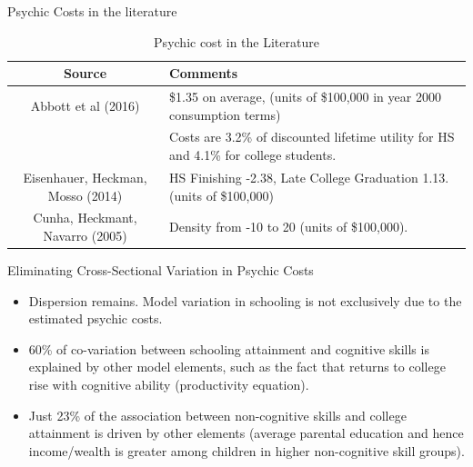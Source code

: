 \documentclass{beamer}
\begin{document}
\begin{frame}{Psychic Costs in the literature}

\begin{table}[H]
\caption {Psychic cost in the Literature} \label{tab:title} 
\begin{center}
  \begin{tabular}{c |  l     }
      \hline
Source & Comments \\\hline

\tiny{Abbott et al (2016)} &\tiny{\$1.35 on average, (units of \$100,000 in year 2000 consumption terms)}  \\

&\tiny{Costs are 3.2\% of discounted lifetime utility for HS and 4.1\% for college students.}  \\\hline

\tiny{Eisenhauer, Heckman, Mosso (2014)} &\tiny{ HS Finishing -2.38, Late College Graduation 1.13. (units of \$100,000)}  \\\hline
\tiny{Cunha, Heckmant, Navarro (2005)} &\tiny{Density from -10 to 20 (units of \$100,000).}  \\\hline

\end{tabular}
\end{center}
\end{table}


\end{frame}


\begin{frame}[label=Return6]{Eliminating Cross-Sectional Variation in Psychic Costs}
\hyperlink{Psychic1}{}

\begin{itemize}
\item Dispersion remains. Model variation in schooling is not exclusively due to the estimated psychic costs.
\item 60\% of co-variation between schooling attainment and cognitive skills is explained by other model elements, such as the fact that returns to college rise with cognitive ability (productivity equation).
\item Just 23\% of the association between non-cognitive skills and college attainment is driven by other elements (average parental education and hence income/wealth is greater among children in higher non-cognitive skill groups).

\end{itemize}

\end{frame}
\end{document}
